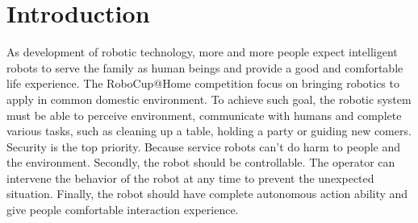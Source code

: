 \section{Introduction}
As development of robotic technology, more and more people expect intelligent robots to serve the family as human beings and provide a good and comfortable life experience. The RoboCup@Home competition \cite{robocupathome} focus on bringing robotics to apply in common domestic environment. To achieve such goal, the robotic system must be able to perceive environment, communicate with humans and complete various tasks, such as cleaning up a table, holding a party or guiding new comers. Security is the top priority. Because service robots can't do harm to people and the environment. Secondly, the robot should be controllable. The operator can intervene the behavior of the robot at any time to prevent the unexpected situation. Finally, the robot should have complete autonomous action ability and give people comfortable interaction experience. 

